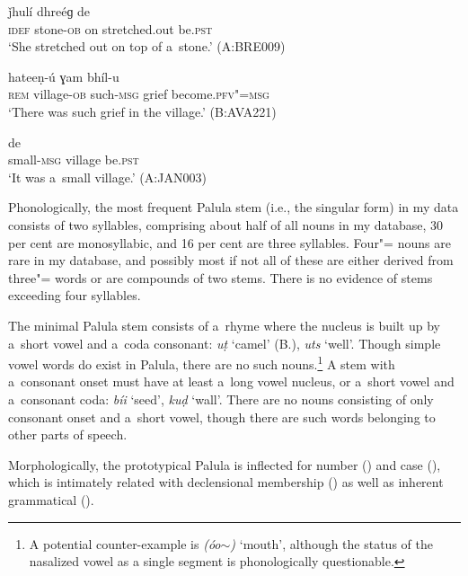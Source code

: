 \begin{exe}
\ex
\label{ex:4-4}
\gll [áa baṭ-á] ǰhulí dhreéɡ de \\ 
\textsc{idef} stone-\textsc{ob} on stretched.out be.\textsc{pst} \\
\glt `She stretched out on top of a~stone.' (A:BRE009)
\end{exe}

\begin{exe}
\ex
\label{ex:4-5}
 hateeṇ-ú ɣam bhíl-u \\
	\textsc{rem} village-\textsc{ob} such-\textsc{msg} grief become.\textsc{pfv"=msg} \\
\glt `There was such grief in the village.' (B:AVA221)
\end{exe}

\begin{exe}
\ex
\label{ex:4-5b}
 de \\
small-\textsc{msg} village be.\textsc{pst} \\
\glt `It was a~small village.' (A:JAN003)
\end{exe}


Phonologically, the most frequent Palula  stem (i.e., the  singular form) in my data consists of two syllables, comprising about half of all nouns in my database, 30 per cent are monosyllabic, and 16 per cent are three syllables. Four"= nouns are rare in my database, and possibly most if not all of these are either derived from three"= words or are compounds of two  stems. There is no evidence of  stems exceeding four syllables. 


The minimal Palula  stem consists of a~rhyme where the nucleus is built up by a~short vowel and a~coda consonant: \textit{uṭ} `camel' (B.), \textit{uts} `well'. Though simple vowel words do exist in Palula, there are no such nouns.\footnote{A potential counter-example is \textit{(óo$\sim$)} `mouth', although the status of the nasalized vowel as a single segment is phonologically questionable.} A  stem with a~consonant onset must have at least a~long vowel nucleus, or a~short vowel and a~consonant coda: \textit{bíi} `seed', \textit{kuḍ} `wall'. There are no nouns consisting of only consonant onset and a~short vowel, though there are such words belonging to other parts of speech.


Morphologically, the prototypical Palula  is inflected for number () and case (), which is intimately related with declensional membership () as well as inherent grammatical  (). 


